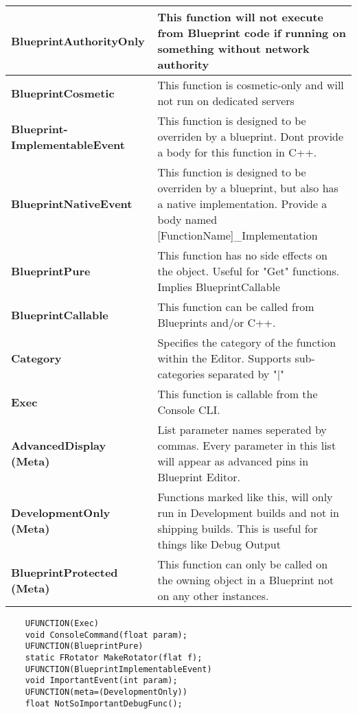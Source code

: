 \documentclass[10pt]{article}
\begin{document}
\begin{multicols*}{5}
\begin{tabularx}{\columnwidth}{|p{4.1cm}|X|}
		\hline \textbf{BlueprintAuthorityOnly}
		& This function will not execute from Blueprint code if running on something without network authority \\
		\hline \textbf{BlueprintCosmetic}
		& This function is cosmetic-only and will not run on dedicated servers \\
		\hline \textbf{Blueprint-ImplementableEvent}
		& This function is designed to be overriden by a blueprint. Dont provide a body for this function in C++. \\
		\hline \textbf{BlueprintNativeEvent}
		& This function is designed to be overriden by a blueprint, but also has a native implementation. Provide a body named [FunctionName]\_Implementation \\
		\hline \textbf{BlueprintPure}
		& This function has no side effects on the object. Useful for "Get" functions. Implies BlueprintCallable \\
		\hline \textbf{BlueprintCallable}
		& This function can be called from Blueprints and/or C++. \\
		\hline \textbf{Category}
		& Specifies the category of the function within the Editor. Supports sub-categories separated by "$\vert$" \\
		\hline \textbf{Exec}
		& This function is callable from the Console CLI. \\	
		\hline \textbf{AdvancedDisplay (Meta)}
		& List parameter names seperated by commas. Every parameter in this list will appear as advanced pins in Blueprint Editor. \\
		\hline \textbf{DevelopmentOnly (Meta)}
		& Functions marked like this, will only run in Development builds and not in shipping builds. This is useful for things like Debug Output\\
		\hline \textbf{BlueprintProtected (Meta)}
		& This function can only be called on the owning object in a Blueprint not on any other instances. \\
		\hline
		
	\end{tabularx}
	
	\begin{verbatim}
	UFUNCTION(Exec)
	void ConsoleCommand(float param);
	UFUNCTION(BlueprintPure)
	static FRotator MakeRotator(flat f);
	UFUNCTION(BlueprintImplementableEvent)
	void ImportantEvent(int param);
	UFUNCTION(meta=(DevelopmentOnly))
	float NotSoImportantDebugFunc();
	\end{verbatim}
	

\end{multicols*}
\end{document}
